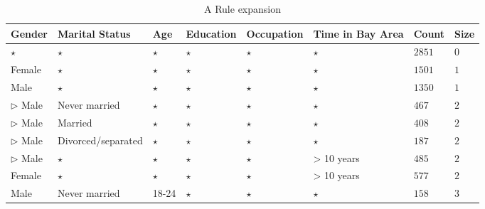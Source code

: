 \documentclass{sig-alternate}
\begin{document}
\begin{table*} 
\centering 
\begin{tabular}{| p{1.5cm} | p{1.5cm} | p{1.5cm} | p{1.5cm} | p{1.5cm} | p{1.5cm} | l | l |} 
\hline Gender & Marital Status & Age & Education & Occupation & Time in Bay Area & Count & Size \\ \hline 
\cline{1-8} $\star$ & $\star$ & $\star$ & $\star$ & $\star$ & $\star$ & $2851$ & $0$ \\
\cline{1-1} \cline{2-2} \cline{3-3} \cline{4-4} \cline{5-5} \cline{6-6} \cline{7-8} Female & $\star$ & $\star$ & $\star$ & $\star$ & $\star$ & $1501$ & $1$ \\
\cline{1-1} \cline{2-2} \cline{3-3} \cline{4-4} \cline{5-5} \cline{6-6} \cline{7-8} Male & $\star$ & $\star$ & $\star$ & $\star$ & $\star$ & $1350$ & $1$ \\
\cline{2-2} \cline{3-3} \cline{4-4} \cline{5-5} \cline{6-6} \cline{7-8} $\triangleright$ Male & Never married & $\star$ & $\star$ & $\star$ & $\star$ & $467$ & $2$ \\
\cline{2-2} \cline{3-3} \cline{4-4} \cline{5-5} \cline{6-6} \cline{7-8} $\triangleright$ Male & Married & $\star$ & $\star$ & $\star$ & $\star$ & $408$ & $2$ \\
\cline{2-2} \cline{3-3} \cline{4-4} \cline{5-5} \cline{6-6} \cline{7-8} $\triangleright$ Male & Divorced/separated & $\star$ & $\star$ & $\star$ & $\star$ & $187$ & $2$ \\
\cline{2-2} \cline{3-3} \cline{4-4} \cline{5-5} \cline{6-6} \cline{7-8} $\triangleright$ Male & $\star$ & $\star$ & $\star$ & $\star$ & > 10 years & $485$ & $2$ \\
\cline{1-1} \cline{2-2} \cline{3-3} \cline{4-4} \cline{5-5} \cline{6-6} \cline{7-8} Female & $\star$ & $\star$ & $\star$ & $\star$ & > 10 years & $577$ & $2$ \\
\cline{1-1} \cline{2-2} \cline{3-3} \cline{4-4} \cline{5-5} \cline{6-6} \cline{7-8} Male & Never married & 18-24 & $\star$ & $\star$ & $\star$ & $158$ & $3$ \\
\hline 
\end{tabular} 
\caption{A Rule expansion \label{table:uiexamplerule}} 
\end{table*}
\end{document}

